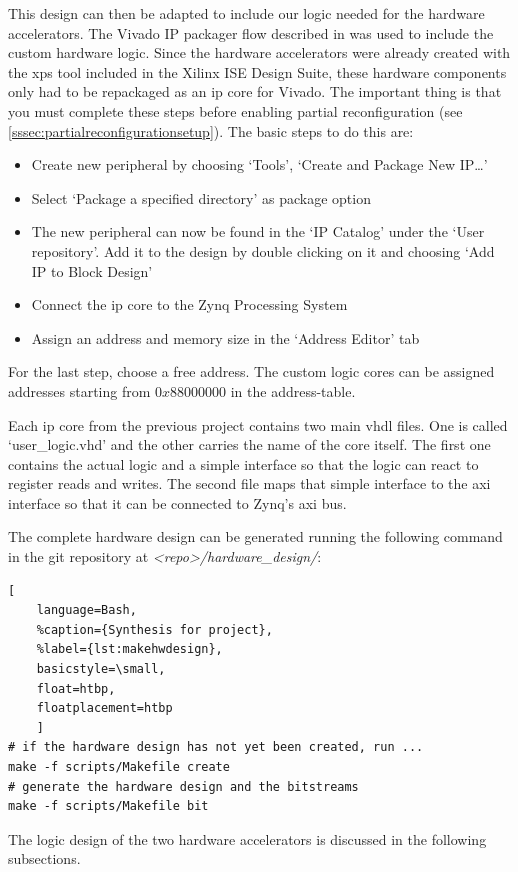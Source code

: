 This design can then be adapted to include our logic needed for the hardware accelerators. The Vivado IP packager flow described in \cite{UG1118} was used to include the custom hardware logic. Since the hardware accelerators were already created with the \gls{xps} tool included in the Xilinx ISE Design Suite, these hardware components only had to be repackaged as an \gls{ip} core for Vivado. The important thing is that you must complete these steps before enabling partial reconfiguration (see \cref{sssec:partialreconfigurationsetup}).
The basic steps to do this are:
\begin{itemize}
	\item Create new peripheral by choosing `Tools', `Create and Package New IP\ldots'
	\item Select `Package a specified directory' as package option
	\item The new peripheral can now be found in the `IP Catalog'
		under the `User repository'.
		Add it to the design by double clicking on it and choosing `Add IP to Block Design'
	\item Connect the \gls{ip} core to the Zynq Processing System
	\item Assign an address and memory size in the `Address Editor' tab
\end{itemize}
For the last step, choose a free address.
The custom logic cores can be assigned addresses starting from $0x88000000$ in the address-table.

Each \gls{ip} core from the previous project contains two main \gls{vhdl} files.
One is called `user\_logic.vhd' and the other carries the name of the core
itself.
The first one contains the actual logic and a simple interface so that the logic can react to register reads and writes.
The second file maps that simple interface to the \gls{axi} interface so that it can be connected to Zynq's \gls{axi} bus.

The complete hardware design can be generated running the following command in the git repository at \emph{<repo>/hardware\_design/}:

\begin{lstlisting}[
	language=Bash,
	%caption={Synthesis for project},
	%label={lst:makehwdesign},
	basicstyle=\small,
	float=htbp,
	floatplacement=htbp
	]
# if the hardware design has not yet been created, run ...
make -f scripts/Makefile create
# generate the hardware design and the bitstreams
make -f scripts/Makefile bit
\end{lstlisting}
\FloatBarrier

The logic design of the two hardware accelerators is discussed in the following
subsections.
